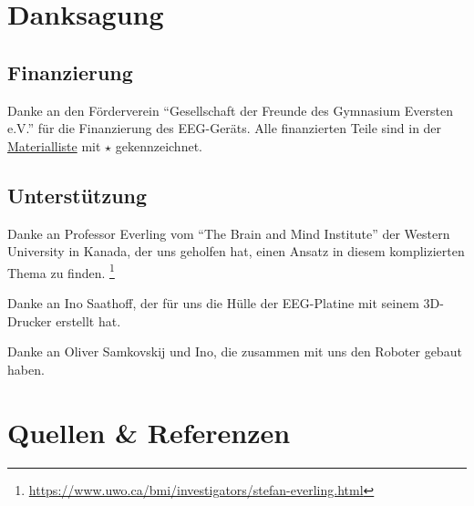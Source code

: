 \documentclass{scrartcl}
\begin{document}
	\section{Danksagung}

	\subsection{Finanzierung} \label{Foerderverein}

	Danke an den Förderverein \enquote{Gesellschaft der Freunde des Gymnasium Eversten e.V.} für die Finanzierung des EEG-Geräts. Alle finanzierten Teile sind in der \hyperref[Materialien]{Materialliste} mit $\star$ gekennzeichnet. 

	\subsection{Unterstützung}

	Danke an Professor Everling vom \enquote{The Brain and Mind Institute} der Western University in Kanada, der uns geholfen hat, einen Ansatz in diesem komplizierten Thema zu finden. \footnote{\href{https://www.uwo.ca/bmi/investigators/stefan-everling.html}{https://www.uwo.ca/bmi/investigators/stefan-everling.html}}

	Danke an Ino Saathoff, der für uns die Hülle der EEG-Platine mit seinem 3D-Drucker erstellt hat.

	Danke an Oliver Samkovskij und Ino, die zusammen mit uns den Roboter gebaut haben.

	\section{Quellen \& Referenzen}

	\printbibliography[title={Literatur}, keyword={Literatur}, notkeyword={YTVideos}]

	\printbibliography[title={Videos}, keyword={YTVideos}]

	\printbibliography[title=Programme, keyword=Programme]
\end{document}
